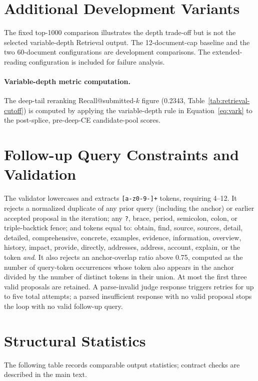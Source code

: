 \section{Additional Development Variants}

The fixed top-1000 comparison illustrates the depth trade-off but is
not the selected variable-depth Retrieval output. The 12-document-cap
baseline and the two 60-document configurations are development
comparisons. The extended-reading configuration is included for failure
analysis.

\paragraph{Variable-depth metric computation.} The deep-tail
reranking Recall@submitted-$k$ figure (0.2343, Table~\ref{tab:retrieval-cutoff})
is computed by applying the variable-depth rule in
Equation~\ref{eq:vark} to the post-splice, pre-deep-CE candidate-pool
scores.

\section{Follow-up Query Constraints and Validation}
\label{app:query-legality}

The validator lowercases and extracts \texttt{[a-z0-9-]+} tokens,
requiring 4--12. It rejects a normalized duplicate of any prior query
(including the anchor) or earlier accepted proposal in the iteration;
any \texttt{?}, brace, period, semicolon, colon, or triple-backtick
fence; and tokens equal to: obtain, find, source, sources, detail,
detailed, comprehensive, concrete, examples, evidence, information,
overview, history, impact, provide, directly, addresses, address,
account, explain, or the token \emph{and}. It also rejects an anchor-overlap ratio above
0.75, computed as the number of query-token occurrences whose token
also appears in the anchor
divided by the number of distinct tokens in their union. At most the
first three valid proposals are retained. A parse-invalid judge response
triggers retries for up to five total attempts; a parsed insufficient response with no
valid proposal stops the loop with no valid follow-up query.

\section{Structural Statistics}
\label{app:structural-stats}

\FloatBarrier
The following table records comparable output statistics; contract
checks are described in the main text.


\FloatBarrier


